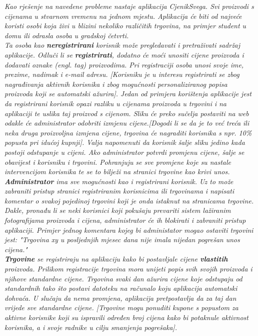 		\textit{Kao rješenje na navedene probleme nastaje aplikacija CjenikSvega. Svi proizvodi s cijenama u stvarnom vremenu na jednom mjestu. Aplikacija će biti od najveće koristi osobi koja živi u blizini nekoliko različitih trgovina, na primjer student u domu ili odrasla osoba u gradskoj četvrti.}\\
		
		\textit{Ta osoba kao \textbf{neregistrirani} korisnik može pregledavati i pretraživati sadržaj aplikacije. Odluči li se \textbf{registrirati}, dodatno će moći unositi cijene proizvoda i dodavati oznake (engl. tag) proizvodima. Pri registraciji osoba unosi svoje ime, prezime, nadimak i e-mail adresu. [Korisniku je u interesu registrirati se zbog nagrađivanja aktivnih korisnika i zbog mogućnosti personaliziranog popisa proizvoda koji se automatski ažurira]. Jedan od primjera korištenja aplikacije jest da registrirani korisnik opazi razliku u cijenama proizvoda u trgovini i na aplikaciji te uslika taj proizvod s cijenom. Sliku će preko sučelja postaviti na web odakle će administrator odobriti izmjenu cijene.[Dogodi li se da je to već treća ili neka druga proizvoljna izmjena cijene, trgovina će nagraditi korisnika s npr. 10\% popusta pri idućoj kupnji]. Valja napomenuti da korisnik šalje sliku jedino kada postoji odstupanje u cijeni. Ako administrator potvrdi promjenu cijene, šalje se obavijest i korisniku i trgovini. Pohranjuju se sve promjene koje su nastale intervencijom korisnika te se to bilježi na stranici trgovine kao krivi unos.}\\
		
		\textit{\textbf{Administrator} ima sve mogućnosti kao i registrirani korisnik. Uz to može zabraniti pristup stranici registriranim korisnicima ili trgovinama i napisati komentar o svakoj pojedinoj trgovini koji je onda istaknut na stranicama trgovine. Dakle, 
pronađu li se neki korisnici koji pokušaju prevariti sistem lažiranim fotografijama proizvoda i cijena, administrator će ih blokirati i zabraniti pristup aplikaciji. Primjer jednog komentara kojeg bi administator mogao ostaviti trgovini jest: "Trgovina xy u posljednjih mjesec dana nije imala nijedan pogrešan unos cijena."}\\
		
		\textit{\textbf{Trgovine} se registriraju na aplikaciju kako bi postavljale cijene \textbf{vlastitih} proizvoda. Prilikom registracije trgovina mora unijeti popis svih svojih proizvoda i njihove standardne cijene. Trgovina svaki dan ažurira cijene koje odstupaju od standardnih tako što postavi datoteku na računalo koju aplikacija automatski dohvaća. U slučaju da nema promjena, aplikacija pretpostavlja da za taj dan vrijede sve standardne cijene. [Trgovine mogu ponuditi kupone s popustom za aktivne korisnike koji su ispravili određen broj cijena kako bi potaknule aktivnost korisnika, a i svoje radnike u cilju smanjenja pogrešaka].}\\
		
